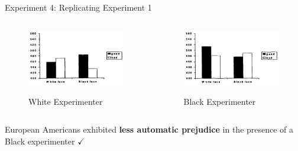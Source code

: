     \begin{frame}{Experiment 4: Replicating Experiment 1}
        
        \begin{columns}
            \begin{column}{0.45\textwidth}
                \begin{figure}
                \centering
                \includegraphics[height = 0.43 \textheight]{images/result4_1_white.png}
                
                {\footnotesize White Experimenter}
                \end{figure}
            \end{column}
            
            \begin{column}{0.45\textwidth}
                \begin{figure}
                    \centering
                    \includegraphics[height = 0.43 \textheight]{images/result4_1_black.png}
                    
                    {\footnotesize Black Experimenter}
                \end{figure}
            \end{column}
        \end{columns}
        \vspace*{10pt}
        European Americans exhibited \textcolor{lightlavender!55!white}{\textbf{less automatic prejudice}} in the presence of a Black experimenter \textcolor{lightlavender!55!white}{$\checkmark$}
    \end{frame}


